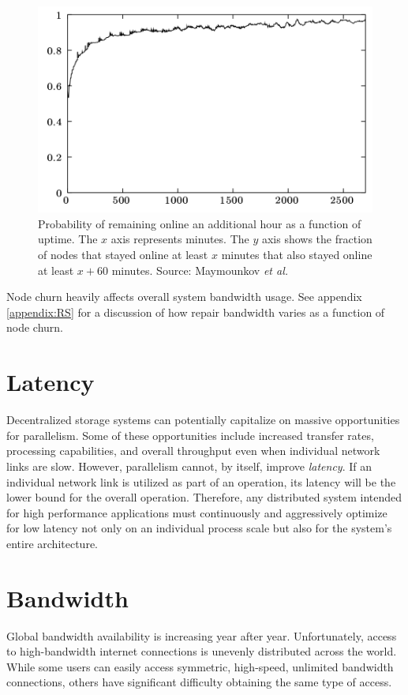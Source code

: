 \documentclass[11pt,fleqn,openany]{book}
\begin{document}
\begin{figure}
\centering
\includegraphics[width=.6\textwidth]{images/uptime.png}
\caption{Probability of remaining online an additional hour as a function of
uptime.
The $x$ axis represents minutes. The $y$ axis shows the fraction of nodes
that stayed online at least $x$ minutes that also stayed online at least
$x+60$ minutes. Source: Maymounkov {\em et al.} \cite{kad}}
\label{fig:kad-uptime}
\end{figure}

Node churn heavily affects overall system bandwidth usage.
See appendix \ref{appendix:RS} for a discussion of how repair bandwidth
varies as a function of node churn.

\section{Latency}

Decentralized storage systems can potentially capitalize on
massive opportunities for parallelism.
Some of these opportunities include increased transfer rates, processing
capabilities, and overall throughput even when individual
network links are slow. However, parallelism cannot, by itself, improve {\em
latency}. If an individual network link is utilized as part of an operation,
its latency will be the lower bound for the overall operation.
Therefore, any distributed system
intended for high performance applications must continuously and aggressively
optimize for low latency not only on an individual process scale but also for
the system's entire architecture.

\section{Bandwidth}\label{sec:req-bandwidth}

Global bandwidth availability is increasing year after year. Unfortunately,
access to
high-bandwidth internet connections is unevenly distributed across the world.
While some users can easily access symmetric, high-speed, unlimited bandwidth
connections, others have significant difficulty obtaining the same type of access.
\end{document}
